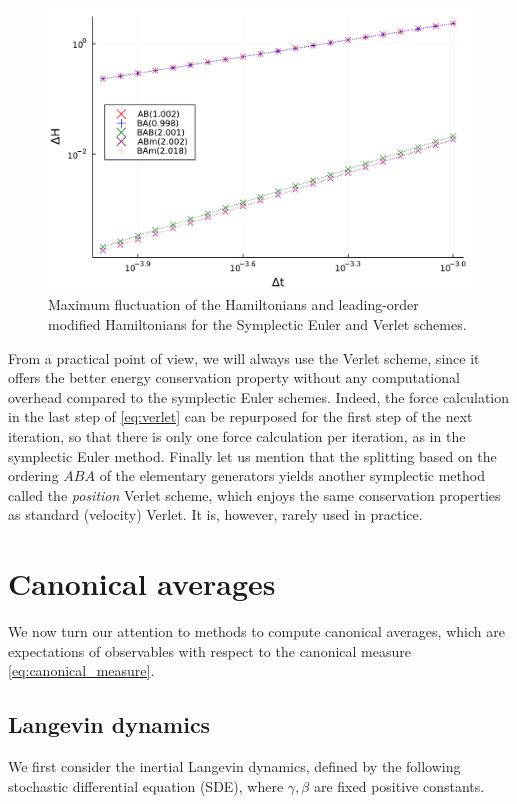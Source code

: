     \begin{figure}[htbp]
        \begin{center}
          \includegraphics[width=0.85\linewidth]{figures/chapter1/energy_conservation.pdf}
          \caption{ \label{fig:hamiltonian_conservation}
            Maximum fluctuation of the Hamiltonians and leading-order modified Hamiltonians for the Symplectic Euler and Verlet schemes.
          }
        \end{center}
      \end{figure}

    From a practical point of view, we will always use the Verlet scheme, 
    since it offers the better energy conservation property without any computational overhead compared to the symplectic Euler schemes. 
    Indeed, the force calculation in the last step of \eqref{eq:verlet} can be repurposed for the first step of the next iteration, so that there is only one force calculation per iteration, as in the symplectic Euler method.
    Finally let us mention that the splitting based on the ordering $ABA$ of the elementary generators yields another symplectic method called the \textit{position} Verlet scheme, which enjoys the same conservation properties as standard (velocity) Verlet.
    It is, however, rarely used in practice.

\section{Canonical averages}
We now turn our attention to methods to compute canonical averages, which are expectations of observables with respect to the canonical measure \eqref{eq:canonical_measure}.
\subsection{Langevin dynamics}
We first consider the inertial Langevin dynamics, defined by the following stochastic differential equation (SDE), where $\gamma, \beta$ are fixed positive constants.

